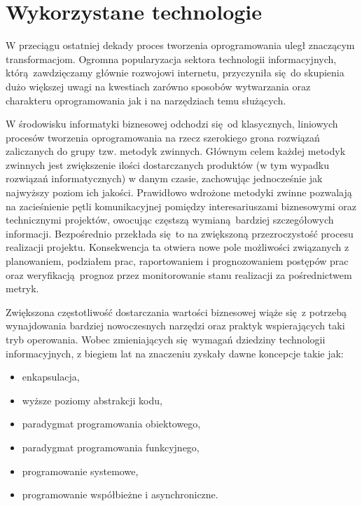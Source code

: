 \section{Wykorzystane technologie}\label{ss_internals-technologies}
W przeciągu ostatniej dekady proces tworzenia oprogramowania uległ znaczącym
transformacjom.
Ogromna popularyzacja sektora technologii informacyjnych, którą zawdzięczamy głównie rozwojowi internetu, przyczyniła się do skupienia dużo większej uwagi na kwestiach zarówno sposobów wytwarzania oraz charakteru oprogramowania jak i na narzędziach temu służących.

W środowisku informatyki biznesowej odchodzi się od klasycznych, liniowych procesów tworzenia oprogramowania na rzecz szerokiego grona rozwiązań zaliczanych do grupy tzw. metodyk zwinnych. 
Głównym celem każdej metodyk zwinnych jest zwiększenie ilości dostarczanych produktów (w tym wypadku rozwiązań informatycznych) w danym czasie, zachowując jednocześnie jak najwyższy poziom ich jakości.
Prawidłowo wdrożone metodyki zwinne pozwalają na zacieśnienie pętli komunikacyjnej pomiędzy interesariuszami biznesowymi oraz technicznymi projektów, owocując częstszą wymianą bardziej szczegółowych informacji.
Bezpośrednio przekłada się to na zwiększoną przezroczystość procesu realizacji projektu.
Konsekwencja ta otwiera nowe pole możliwości związanych z planowaniem, podziałem prac, raportowaniem i prognozowaniem postępów prac oraz weryfikacją prognoz przez monitorowanie stanu realizacji za pośrednictwem metryk.

\par{
Zwiększona częstotliwość dostarczania wartości biznesowej wiąże się z potrzebą wynajdowania bardziej nowoczesnych narzędzi oraz praktyk wspierających taki tryb operowania.
Wobec zmieniających się wymagań dziedziny technologii informacyjnych, z biegiem lat na znaczeniu zyskały dawne koncepcje takie jak:

\begin{itemize}
  \item enkapsulacja,
  \item wyższe poziomy abstrakcji kodu,
  \item paradygmat programowania obiektowego,
  \item paradygmat programowania funkcyjnego,
  \item programowanie systemowe,
  \item programowanie współbieżne i asynchroniczne.
\end{itemize}
}

